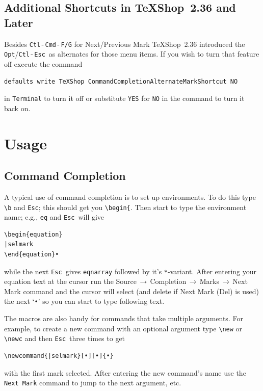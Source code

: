 \documentclass[11pt]{article}
\newcommand{\optkey}{\texttt{Opt}}
\newcommand{\ctlkey}{\texttt{Ctl}}
\newcommand{\cmdkey}{\texttt{Cmd}}
\newcommand{\esckey}{\texttt{Esc}}
\newcommand{\mnu}[1]{\textsf{#1}}
\newcommand{\To}{\,\(\to\)\,}
\newcommand{\TS}{\textsf{\TeX Shop}}
\begin{document}
\subsection*{Additional Shortcuts in \TS\ 2.36 and Later}

Besides \ctlkey\,-\,\cmdkey\,-\,\texttt{F/G} for \mnu{Next/Previous Mark} \TS\ 2.36 introduced the \optkey/\ctlkey\,-\,\esckey\ as alternates for those menu items. If you wish to turn that feature off execute the command
\begin{verbatim}
defaults write TeXShop CommandCompletionAlternateMarkShortcut NO
\end{verbatim}
in \texttt{Terminal} to turn it off or substitute \texttt{YES} for \texttt{NO} in the command to turn it back on.

\section*{Usage}

\subsection*{Command Completion}

A typical use of command completion is to set up environments. To do this type \verb|\b| and \esckey; this should get you \verb|\begin{|. Then start to type the environment name; e.g., \verb|eq| and \esckey\ will give
\begin{verbatim}
\begin{equation}
|selmark
\end{equation}•
\end{verbatim}
while the next \esckey\ gives \texttt{eqnarray} followed by it's \texttt{*}-variant. After entering your equation text at the cursor run the \mnu{Source}\To\mnu{Completion}\To\mnu{Marks}\To\mnu{Next Mark} command and the cursor will select (and  delete if \mnu{Next Mark (Del)} is used) the next `\texttt{•}' so you can start to type following text.

The macros are also handy for commands that take multiple arguments. For example, to create a new command with an optional argument type \verb|\new| or \verb|\newc| and then \esckey\ three times to get
\begin{verbatim}
\newcommand{|selmark}[•][•]{•}
\end{verbatim}
with the first mark selected. After entering the new command's name use the \texttt{Next Mark} command to jump to the next argument, etc.
\end{document}
